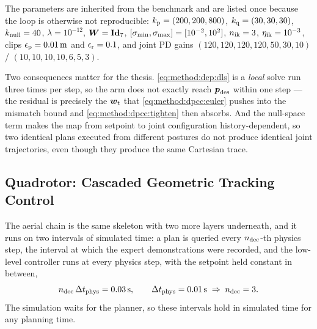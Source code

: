 The parameters are inherited from the benchmark and are listed once because the loop is otherwise
not reproducible: $k_{\textrm{p}} = (200,200,800)$, $k_{\textrm{q}} = (30,30,30)$, $k_{\textrm{null}} = 40$,
$\lambda = 10^{-12}$, $\boldsymbol{W} = \textbf{Id}_{7}$, $[\sigma_{\textrm{min}},\sigma_{\textrm{max}}] = [10^{-2},10^{2}]$,
$n_{\textrm{ik}} = 3$, $\eta_{\textrm{ik}} = 10^{-3}$, clips $\epsilon_{\textrm{p}} = 0.01\,\textrm{m}$ and
$\epsilon_{\textrm{r}} = 0.1$, and joint PD gains
$(120,120,120,120,50,30,10)$ / $(10,10,10,10,6,5,3)$.

Two consequences matter for the thesis. \eqref{eq:method:dep:dls} is a \emph{local} solve run three
times per step, so the arm does not exactly reach $\boldsymbol{p}_{\textrm{des}}$ within one step --- the residual
is precisely the $\boldsymbol{w}_{t}$ that \eqref{eq:method:dpcc:euler} pushes into the mismatch bound and
\eqref{eq:method:dpcc:tighten} then absorbs. And the null-space term makes the map from setpoint to
joint configuration history-dependent, so two identical plans executed from different postures do not
produce identical joint trajectories, even though they produce the same Cartesian trace.

\subsection{Quadrotor: Cascaded Geometric Tracking Control}\label{sec:method:geometric}

The aerial chain is the same skeleton with two more layers underneath, and it runs on two intervals of
simulated time: a plan is queried every $n_{\textrm{dec}}$-th physics step, the interval at which the expert
demonstrations were recorded, and the low-level controller runs at every physics step, with the
setpoint held constant in between,
\begin{equation}\label{eq:method:dep:multirate}
  n_{\textrm{dec}}\,\Delta t_{\textrm{phys}} = 0.03\,\textrm{s},
  \qquad
  \Delta t_{\textrm{phys}} = 0.01\,\textrm{s}
  \;\Rightarrow\; n_{\textrm{dec}} = 3 .
\end{equation}
The simulation waits for the planner, so these intervals hold in simulated time for any planning
time.

